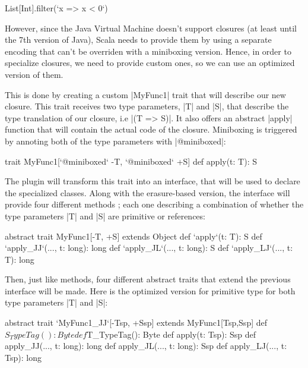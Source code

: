 \begin{lstlisting-nobreak}
 List[Int].filter(`x => x < 0`)
\end{lstlisting-nobreak}

However, since the Java Virtual Machine doesn't support closures (at least until the 7th version of Java), Scala needs to provide them by using a separate encoding that can't be overriden with a miniboxing version. Hence, in order to specialize closures, we need to provide custom ones, so we can use an optimized version of them.

This is done by creating a custom |MyFunc1| trait that will describe our new closure. This trait receives two type parameters, |T| and |S|, that describe the type translation of our closure, i.e |(T => S)|. It also offers an abstract |apply| function that will contain the actual code of the closure. Miniboxing is triggered by annoting both of the type parameters with |@miniboxed|:

\begin{lstlisting-nobreak}
 trait MyFunc1[`@miniboxed` -T, `@miniboxed` +S] {
   def apply(t: T): S
 }
\end{lstlisting-nobreak}

The plugin will transform this trait into an interface, that will be used to declare the specialized classes. Along with the erasure-based version, the interface will provide four different methods ; each one describing a combination of whether the type parameters |T| and |S| are primitive or references:

\begin{lstlisting-nobreak}
  abstract trait MyFunc1[-T, +S] extends Object {
    def `apply`(t: T): S
    def `apply_JJ`(..., t: long): long
    def `apply_JL`(..., t: long): S
    def `apply_LJ`(..., t: T): long
  }
\end{lstlisting-nobreak}

Then, just like methods, four different abstract traits that extend the previous interface will be made. Here is the optimized version for primitive type for both type parameters |T| and |S|:

\begin{lstlisting-nobreak}
  abstract trait `MyFunc1_JJ`[-Tsp, +Ssp]
        extends MyFunc1[Tsp,Ssp] {
    def $S_TypeTag(): Byte
    def $T_TypeTag(): Byte
    def apply(t: Tsp): Ssp
    def apply_JJ(..., t: long): long
    def apply_JL(..., t: long): Ssp
    def apply_LJ(..., t: Tsp): long
  }
  
\end{lstlisting-nobreak}

